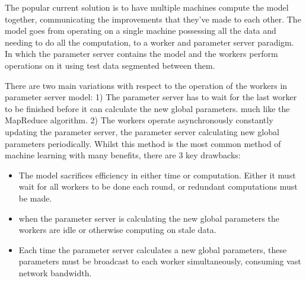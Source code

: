 
The popular current solution is to have multiple machines compute the model
together, communicating the improvements that they've made to each other. The
model goes from operating on a single machine possessing all the data and
needing to do all the computation, to a worker and parameter server paradigm. In
which the parameter server contains the model and the workers perform operations
on it using test data segmented between them. \cite{LI2014ParameterServers}
\par

There are two main variations with respect to the operation of the workers in
parameter server model: 1) The parameter server has to wait for the last worker
to be finished before it can calculate the new global parameters. much like the
MapReduce algorithm. \cite{googlemapreduce2008} 2) The workers operate
asynchronously constantly updating the parameter server, the parameter server
calculating new global parameters periodically.  \cite{Qirong2013SSP} Whilst
this method is the most common method of machine learning with many benefits,
there are 3 key drawbacks:
\begin{itemize}
    \item The model sacrifices efficiency in either time or computation. Either
    it must wait for all workers to be done each round, or redundant
    computations must be made. \cite{Chilimbi2014ADAM}
    \item when the parameter server is calculating the new global parameters the
    workers are idle or otherwise computing on stale data. \cite{Verbraeken2020MLSurvey}
    \item Each time the parameter server calculates a new global parameters,
    these parameters must be broadcast to each worker simultaneously, consuming
    vast network bandwidth. \cite{LI2014ParameterServers}
\end{itemize}

